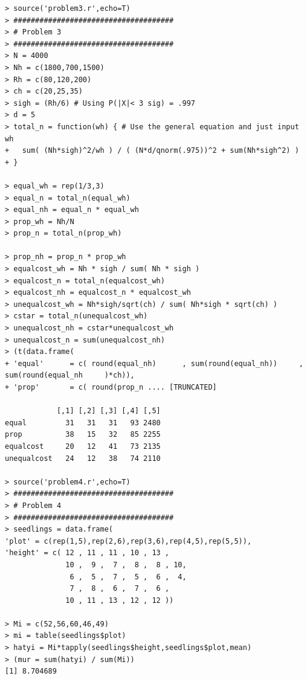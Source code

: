 \documentclass[usenames,dvipsnames]{homework}
\begin{document}
\begin{lstlisting}
> source('problem3.r',echo=T) 
> #####################################                                                                                                                                                  
> # Problem 3                                                                                                                                                                            
> #####################################                                                                                                                                                  
> N = 4000                                                                                                                                                                               
> Nh = c(1800,700,1500) 
> Rh = c(80,120,200) 
> ch = c(20,25,35) 
> sigh = (Rh/6) # Using P(|X|< 3 sig) = .997 
> d = 5 
> total_n = function(wh) { # Use the general equation and just input wh
+   sum( (Nh*sigh)^2/wh ) / ( (N*d/qnorm(.975))^2 + sum(Nh*sigh^2) )
+ }

> equal_wh = rep(1/3,3) 
> equal_n = total_n(equal_wh) 
> equal_nh = equal_n * equal_wh 
> prop_wh = Nh/N 
> prop_n = total_n(prop_wh)

> prop_nh = prop_n * prop_wh 
> equalcost_wh = Nh * sigh / sum( Nh * sigh ) 
> equalcost_n = total_n(equalcost_wh) 
> equalcost_nh = equalcost_n * equalcost_wh 
> unequalcost_wh = Nh*sigh/sqrt(ch) / sum( Nh*sigh * sqrt(ch) ) 
> cstar = total_n(unequalcost_wh) 
> unequalcost_nh = cstar*unequalcost_wh 
> unequalcost_n = sum(unequalcost_nh) 
> (t(data.frame(
+ 'equal'      = c( round(equal_nh)      , sum(round(equal_nh))     , sum(round(equal_nh     )*ch)),
+ 'prop'       = c( round(prop_n .... [TRUNCATED] 

            [,1] [,2] [,3] [,4] [,5]
equal         31   31   31   93 2480
prop          38   15   32   85 2255
equalcost     20   12   41   73 2135
unequalcost   24   12   38   74 2110

> source('problem4.r',echo=T)
> #####################################
> # Problem 4
> #####################################
> seedlings = data.frame(
'plot' = c(rep(1,5),rep(2,6),rep(3,6),rep(4,5),rep(5,5)),
'height' = c( 12 , 11 , 11 , 10 , 13 ,    
              10 ,  9 ,  7 ,  8 ,  8 , 10,
               6 ,  5 ,  7 ,  5 ,  6 ,  4,
               7 ,  8 ,  6 ,  7 ,  6 ,   
              10 , 11 , 13 , 12 , 12 ))   

> Mi = c(52,56,60,46,49) 
> mi = table(seedlings$plot) 
> hatyi = Mi*tapply(seedlings$height,seedlings$plot,mean) 
> (mur = sum(hatyi) / sum(Mi))
[1] 8.704689


\end{lstlisting}
\end{document}
